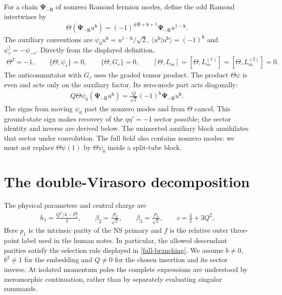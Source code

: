\documentclass[12pt]{article}
\newcommand{\ie}{\begin{equation}\begin{aligned}}
\newcommand{\fe}{\end{aligned}\end{equation}}
\numberwithin{equation}{section}
\begin{document}
For a chain $\boldsymbol\Psi_{-\mathsf B}$ of nonzero Ramond fermion
modes, define the odd Ramond intertwiner by
\ie
 \Theta(\boldsymbol\Psi_{-\mathsf B}u^{\mathsf b})
 =(-1)^{\#\mathsf B+\mathsf b+1}
 \boldsymbol\Psi_{-\mathsf B}u^{1-\mathsf b}.
\fe
The auxiliary conventions are
$\psi_0u^{\mathsf b}=u^{1-\mathsf b}/\sqrt2$,
$\langle u^{\mathsf b}|u^{\mathsf b}\rangle=(-1)^{\mathsf b}$ and
$\psi_r^\dagger=-\psi_{-r}$.  Directly from the displayed definition,
\ie
 \Theta^2=-1,\qquad \{\Theta,\psi_r\}=0,
 \qquad \{\Theta,G_r\}=0,\qquad
 [\Theta,L_m]=[\Theta,L_m^{(1)}]=[\Theta,L_m^{(2)}]=0.
\fe
The anticommutator with $G_r$ uses the graded tensor product.  The product
$\Theta\psi$ is even and acts only on the auxiliary factor.  Its
zero-mode part acts diagonally:
\ie
 Q\Theta\psi_0
 (\boldsymbol\Psi_{-\mathsf B}u^{\mathsf b})
 =\frac{Q}{\sqrt2}(-1)^{\mathsf b}
 \boldsymbol\Psi_{-\mathsf B}u^{\mathsf b}.
 \label{zero-mode-action}
\fe
The signs from moving $\psi_0$ past the nonzero modes and from $\Theta$
cancel.  This ground-state sign makes recovery of the $\eta\eta'=-1$
sector possible; the sector identity and inverse are derived below.
The uninserted auxiliary block annihilates that sector under convolution.
The full field also contains nonzero modes: we must not replace
$\Theta\psi(1)$ by $\Theta\psi_0$ inside a split-tube block.

\section{The double-Virasoro decomposition}

The physical parameters and central charge are
\ie
 h_1=\frac{Q^2/4-P_1^2}{2},\qquad
 \beta_2=\frac{P_2}{\sqrt2},\qquad
 \beta_3=\frac{P_3}{\sqrt2},\qquad c=\frac32+3Q^2.
\fe
Here $p_1$ is the intrinsic parity of the NS primary and $f$ is the
relative outer three-point label used in the human notes.  In particular,
the allowed descendant parities satisfy the selection rule displayed
in \eqref{full-branching}.  We assume $b\ne0$, $b^2\ne1$ for the
embedding and $Q\ne0$ for the chosen insertion and its sector inverse.
At isolated momentum poles the complete expressions are
understood by meromorphic continuation, rather than by separately
evaluating singular summands.
\end{document}
